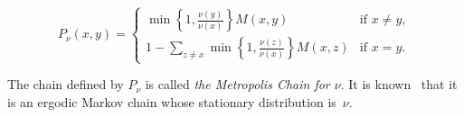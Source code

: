 $$
P_\nu(x,y)=
\left\{
\begin{array}{ll}
\min\left\{1,\frac{\nu(y)}{\nu(x)}\right\} M(x,y)& \text{if } x\neq y,\\
1-\sum_{z\neq x}\min\left\{1,\frac{\nu(z)}{\nu(x)}\right\} M(x,z)& \text{if } x= y.
\end{array}\right. 
$$

The chain defined by $P_\nu$ is called {\it the Metropolis Chain for $\nu$}.
It is known~\cite[Chapter 3]{mixing} that it is an ergodic Markov chain
whose stationary distribution is~$\nu$.


